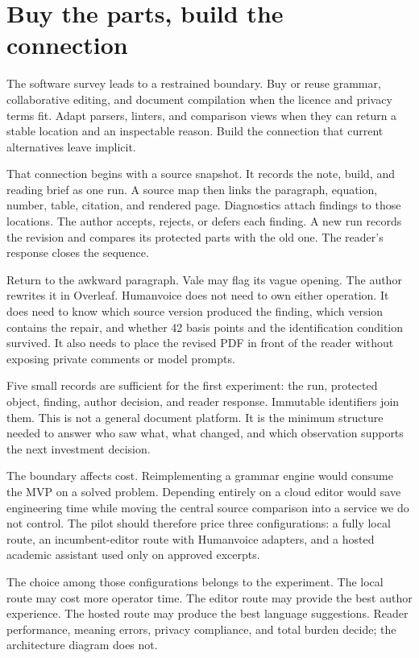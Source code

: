 \section{Buy the parts, build the connection}
\label{sec:component-build-boundary}

The software survey leads to a restrained boundary. Buy or reuse grammar,
collaborative editing, and document compilation when the licence and privacy
terms fit. Adapt parsers, linters, and comparison views when they can return a
stable location and an inspectable reason. Build the connection that current
alternatives leave implicit.

That connection begins with a source snapshot. It records the note, build, and
reading brief as one run. A source map then links the paragraph, equation,
number, table, citation, and rendered page. Diagnostics attach findings to
those locations. The author accepts, rejects, or defers each finding. A new run
records the revision and compares its protected parts with the old one. The
reader's response closes the sequence.

Return to the awkward paragraph. Vale may flag its vague opening. The author
rewrites it in Overleaf. Humanvoice does not need to own either operation. It
does need to know which source version produced the finding, which version
contains the repair, and whether 42 basis points and the identification
condition survived. It also needs to place the revised PDF in front of the
reader without exposing private comments or model prompts.

Five small records are sufficient for the first experiment: the run, protected
object, finding, author decision, and reader response. Immutable identifiers
join them. This is not a general document platform. It is the minimum structure
needed to answer who saw what, what changed, and which observation supports the
next investment decision.

The boundary affects cost. Reimplementing a grammar engine would consume the
MVP on a solved problem. Depending entirely on a cloud editor would save
engineering time while moving the central source comparison into a service we
do not control. The pilot should therefore price three configurations: a fully
local route, an incumbent-editor route with Humanvoice adapters, and a hosted
academic assistant used only on approved excerpts.

The choice among those configurations belongs to the experiment. The local
route may cost more operator time. The editor route may provide the best author
experience. The hosted route may produce the best language suggestions. Reader
performance, meaning errors, privacy compliance, and total burden decide; the
architecture diagram does not.

